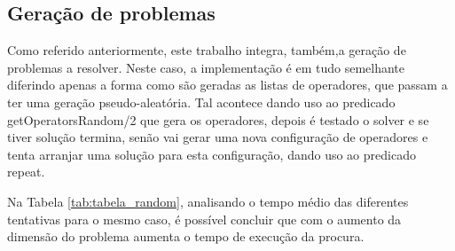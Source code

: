 \subsection{Geração de problemas}
Como referido anteriormente, este trabalho integra, também,a geração de problemas a resolver. Neste caso, a implementação é em tudo semelhante diferindo apenas a forma como são geradas as listas de operadores, que passam a ter uma geração pseudo-aleatória. Tal acontece dando uso ao predicado getOperatorsRandom/2 que gera os operadores, depois é testado o solver e se tiver solução termina, senão vai gerar uma nova configuração de operadores e tenta arranjar uma solução para esta configuração, dando uso ao predicado repeat. 


Na Tabela \ref{tab:tabela_random}, analisando o tempo médio das diferentes tentativas para o mesmo caso, é possível concluir que com o aumento da dimensão do problema  aumenta o tempo de execução da procura.
